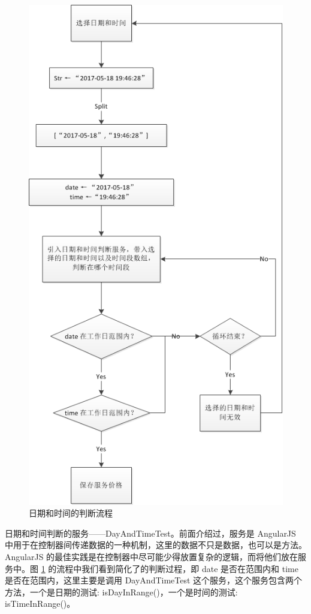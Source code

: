         \begin{figure}[H]
          \centering
          \includegraphics[width=12cm]{./img/DateAndTime.png}
          \caption{日期和时间的判断流程}
          \label{fig:DateAndTime}
        \end{figure}
        \par
        日期和时间判断的服务——DayAndTimeTest。前面介绍过，服务是 AngularJS 中用于在控制器间传递数据的一种机制，这里的数据不只是数据，也可以是方法。AngularJS 的最佳实践是在控制器中尽可能少得放置复杂的逻辑，而将他们放在服务中。图 \ref{fig:DateAndTime} 的流程中我们看到简化了的判断过程，即 date 是否在范围内和 time 是否在范围内，这里主要是调用 DayAndTimeTest 这个服务，这个服务包含两个方法，一个是日期的测试: isDayInRange()，一个是时间的测试: isTimeInRange()。
